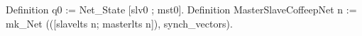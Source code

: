 Definition q0 := Net_State [slv0 ; mst0].
Definition MasterSlaveCoffeepNet n := 
      mk_Net (([slavelts n; masterlts n]), synch_vectors).
